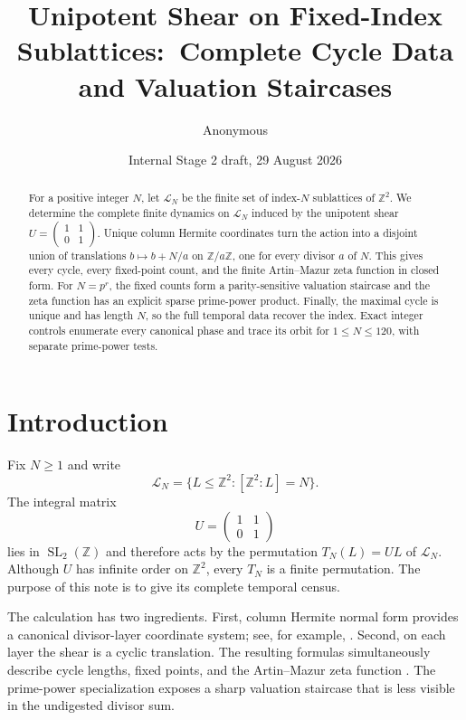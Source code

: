 \documentclass[11pt,a4paper]{amsart}
\title[Unipotent shear on sublattices]{Unipotent Shear on Fixed-Index Sublattices:\ Complete Cycle Data and Valuation Staircases}
\author{Anonymous}
\date{Internal Stage 2 draft, 29 August 2026}
\newcommand{\Z}{\mathbb Z}
\newcommand{\cL}{\mathcal L}
\begin{document}
\begin{abstract}
For a positive integer $N$, let $\cL_N$ be the finite set of index-$N$
sublattices of $\Z^2$.  We determine the complete finite dynamics on
$\cL_N$ induced by the unipotent shear
$U=\left(\begin{smallmatrix}1&1\\0&1\end{smallmatrix}\right)$.
Unique column Hermite coordinates turn the action into a disjoint union of
translations $b\mapsto b+N/a$ on $\Z/a\Z$, one for every divisor $a$ of
$N$.  This gives every cycle, every fixed-point count, and the finite
Artin--Mazur zeta function in closed form.  For $N=p^r$, the fixed counts
form a parity-sensitive valuation staircase and the zeta function has an
explicit sparse prime-power product.  Finally, the maximal cycle is unique
and has length $N$, so the full temporal data recover the index.  Exact
integer controls enumerate every canonical phase and trace its orbit for
$1\leq N\leq120$, with separate prime-power tests.
\end{abstract}

\maketitle

\section{Introduction}

Fix $N\geq1$ and write
\[
 \cL_N=\{L\leq\Z^2:[\Z^2:L]=N\}.
\]
The integral matrix
\[
 U=\begin{pmatrix}1&1\\0&1\end{pmatrix}
\]
lies in $\operatorname{SL}_2(\Z)$ and therefore acts by the permutation
$T_N(L)=UL$ of $\cL_N$.  Although $U$ has infinite order on $\Z^2$, every
$T_N$ is a finite permutation.  The purpose of this note is to give its
complete temporal census.

The calculation has two ingredients.  First, column Hermite normal form
provides a canonical divisor-layer coordinate system; see, for example,
\citet[Chapter~2]{Cohen1993}.  Second, on each layer the shear is a cyclic
translation.  The resulting formulas simultaneously describe cycle
lengths, fixed points, and the Artin--Mazur zeta function
\citep{ArtinMazur1965}.  The prime-power specialization exposes a sharp
valuation staircase that is less visible in the undigested divisor sum.
\end{document}
